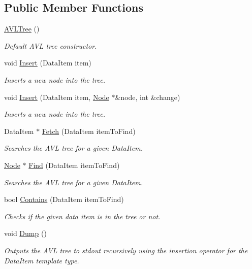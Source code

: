 \subsection*{Public Member Functions}
\begin{DoxyCompactItemize}
\item 
\hyperlink{classAVLTree_a685459c83f9879c6c99687cd620033cc}{A\-V\-L\-Tree} ()
\begin{DoxyCompactList}\small\item\em Default A\-V\-L tree constructor. \end{DoxyCompactList}\item 
void \hyperlink{classAVLTree_a19150bcba8501c6ae6fb2b519ad64b05}{Insert} (Data\-Item item)
\begin{DoxyCompactList}\small\item\em Inserts a new node into the tree. \end{DoxyCompactList}\item 
void \hyperlink{classAVLTree_a7d45f6097e6f9f696ed80b80c8a88722}{Insert} (Data\-Item item, \hyperlink{structAVLTree_1_1Node}{Node} $\ast$\&node, int \&change)
\begin{DoxyCompactList}\small\item\em Inserts a new node into the tree. \end{DoxyCompactList}\item 
Data\-Item $\ast$ \hyperlink{classAVLTree_a8c1cdcd4e4be5f0feb9b2bad5ef08b08}{Fetch} (Data\-Item item\-To\-Find)
\begin{DoxyCompactList}\small\item\em Searches the A\-V\-L tree for a given Data\-Item. \end{DoxyCompactList}\item 
\hyperlink{structAVLTree_1_1Node}{Node} $\ast$ \hyperlink{classAVLTree_a88e4e21a384e6dc4d9be64bfd26e642e}{Find} (Data\-Item item\-To\-Find)
\begin{DoxyCompactList}\small\item\em Searches the A\-V\-L tree for a given Data\-Item. \end{DoxyCompactList}\item 
bool \hyperlink{classAVLTree_af87b660c0c905507b3210abeecff8f8f}{Contains} (Data\-Item item\-To\-Find)
\begin{DoxyCompactList}\small\item\em Checks if the given data item is in the tree or not. \end{DoxyCompactList}\item 
\hypertarget{classAVLTree_a04db67e206a1d00093ae74a6506dcf59}{void \hyperlink{classAVLTree_a04db67e206a1d00093ae74a6506dcf59}{Dump} ()}\label{classAVLTree_a04db67e206a1d00093ae74a6506dcf59}

\begin{DoxyCompactList}\small\item\em Outputs the A\-V\-L tree to stdout recursively using the insertion operator for the Data\-Item template type. \end{DoxyCompactList}\end{DoxyCompactItemize}
